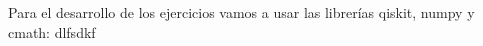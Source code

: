\documentclass[11pt]{article}
\begin{document}
	
	

	Para el desarrollo de los ejercicios vamos a usar las librerías qiskit, numpy y cmath:
\newpage
	dlfsdkf
\end{document}
